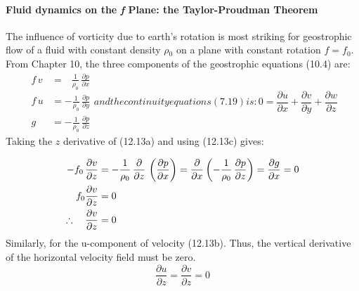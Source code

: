 \paragraph{Fluid dynamics on the \textbf{\textit{f}} Plane: the Taylor-Proudman
Theorem} The
influence of vorticity due to earth's rotation is most striking for
geostrophic flow of a fluid with constant density $\rho{_0}$ on a
plane with constant rotation $f = f_0$. From Chapter 10, the three
components of the geostrophic equations (10.4) are:
\begin{subequations}
\begin{align}
f\,v &= \;\;\, \frac{1}{\rho_{0}}\,\frac{\partial{p}}{\partial{x}} \\
f\,u  &= -\frac{1}{\rho_{0}}\,\frac{\partial{p}}{\partial{y}} \\
g     &= -\frac{1}{\rho_{0}}\,\frac{\partial{p}}{\partial{z}}
\end{align}
and the continuity equations (7.19) is:
\begin{equation}
0 = \frac{\partial{u}}{\partial{x}} + \frac{\partial{v}}{\partial{y}} +
\frac{\partial{w}}{\partial{z}}
\end{equation}
\end{subequations}
Taking the $z$ derivative of (12.13a) and using (12.13c) gives:

\begin{align}
-f_0\,\frac{\partial{v}}{\partial{z}} &= -\frac{1}{\rho_{0}}\,\frac{\partial
}{\partial{z}}\,
\left(\frac{\partial{p}}{\partial{x}}\right) = \frac{\partial
}{\partial{x}}\left(-\frac{1}{\rho_{0}}\,\frac{\partial{p}}{\partial{z}}\right) =
\frac{\partial g}{\partial x}= 0
\notag \\
 f_{0} \frac{\partial{v}}{\partial{z}} &= 0 \notag \\
\therefore \quad \frac{\partial{v}}{\partial{z}} &= 0 \notag
\end{align}
Similarly, for the u-component of velocity (12.13b). Thus, the vertical derivative
of the horizontal velocity field must be zero.
\begin{equation}
\boxed{ \frac{\partial{u}}{\partial{z}} = \frac{\partial{v}}{\partial{z}} =0  }
\end{equation}

